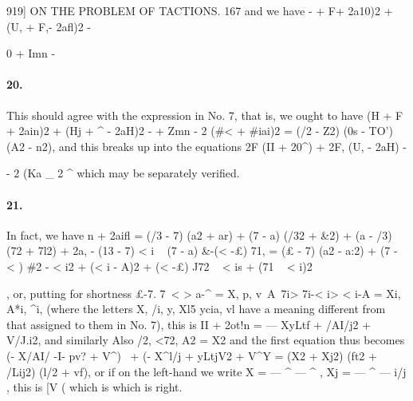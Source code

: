 \documentclass[11pt,a4paper]{book}
\begin{document}
{{{{{{{{{{{{{919]  ON  THE  PROBLEM  OF  TACTIONS.  167
and  we  have
-
+  F+  2a10)2  +  (U,  +  F,-  2afl)2  -  {0  +  Imn  -
\paragraph{20.} This  should  agree  with  the  expression  in  No.  7,  that  is,  we  ought  to  have
(H  +  F  +  2ain)2  +  (Hj  +  ^  -  2aH)2  -  {\textregistered  +  Zmn  -  2  (\#<   +  \#iai)}2  =  (/2  -  Z2)  (0s  -  TO')  (A2  -  n2),
and  this  breaks  up  into  the  equations
2F  (II  +  20^)  +  2F,  (U,  -  2aH)  -  {\textcopyright  -  2  (Ka
\_  2  ^
which  may  be  separately  verified.
\paragraph{21.} In  fact,  we  have
n  +  2aifl  =     (/3  -  7)  (a2  +  ar)  +  (7  -  a)  (/32  +  \&2)  +  (a  -  /3)  (72  +  7l2)
+  2a,  {-  (13  -  7)  < i  ~  (7  -  a)  \&-(< -£)  71},
=      (£  -  7)  (a2  -  a:2)  +  (7  -  < )  {\#2  -  < i2  +  (< i  -  A)2}  +  (< -£)  J72  ~  < is  +  (71  ~  < i)2},
or,  putting  for  shortness
£-7.  7~< >  a-^  =  X,  p,  v\     A~7i>   7i-< i>  < i-A  =  Xi,  A*i,  ^i,
(where   the   letters   X,   /i,  y,  Xl5  ycia,   vl    have   a   meaning   different    from   that   assigned  to
them  in  No.  7),  this  is
II     +  2ot!n  =  ---    XyLtf      +  /AI/j2  +  V/J.i2,
and  similarly
Also
/2,  <72,  A2  =  X2
and  the  first  equation  thus  becomes
(-  X/AI/  -I-  pv?  +  V^)~  +  (-  X^l/j  +  yLtjV2  +  V^Y  =  (X2  +  Xj2)  (ft2  +   /Lij2)  (l/2  +  vf),
or  if  on  the  left-hand  we  write  X  =  ---  ^  ---  ^  ,  Xj  =  ---  ^  ---  i/j  ,  this  is
[V  (
which  is
which  is  right.


}}}}}}}}}}}}}}
\end{document}
